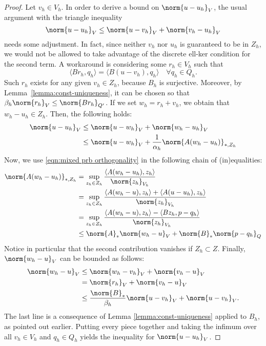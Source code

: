 \begin{proof}
	Let $v_h \in V_h$. In order to derive a bound on $\norm{u-u_h}_V$, the usual argument with the triangle inequality
	\[
	\norm{u-u_h}_V\leq\norm{u-v_h}_V+\norm{v_h-u_h}_V
	\]
	needs some adjustment. In fact, since neither $v_h$ nor $u_h$ is guaranteed to be in $Z_h$, we would not be allowed to take advantage of the discrete ell-ker condition for the second term. A workaround is considering some $r_h \in V_h$ such that
	\[
	\langle Br_h , q_h \rangle = \langle B (u-v_h) , q_h \rangle \quad \forall q_h \in Q_h.
	\]
	Such $r_h$ exists for any given $v_h\in Z_h$, because $B_h$ is surjective. Moreover, by Lemma~\ref{lemma:const-uniqueness}, it can be chosen so that $\beta_h \norm{r_h}_V \le \norm{Br_h}_{Q'}$. If we set $w_h = r_h + v_h$, we obtain that $w_h - u_h \in Z_h$. Then, the following holds:
	\begin{align*}
	    \norm{u-u_h}_V&\leq\norm{u-w_h}_V+\norm{w_h-u_h}_V\\
	    &\leq\norm{u-w_h}_V +\frac{1}{\alpha_h}\norm{A(w_h-u_h)}_{*,Z_h}
	\end{align*}
	Now, we use \eqref{eqn:mixed prb orthogonality} in the following chain of (in)equalities:
	\begin{align*}
	    \norm{A(w_h-u_h)}_{*,Z_h} &= \sup_{z_h\in Z_h}\frac{\langle A(w_h-u_h),z_h\rangle}{\norm{z_h}_{V_h}}\\
	    &= \sup_{z_h\in Z_h}\frac{\langle A(w_h-u),z_h\rangle + \langle A(u-u_h),z_h\rangle}{\norm{z_h}_{V_h}}\\
	    &= \sup_{z_h\in Z_h}\frac{\langle A(w_h-u),z_h\rangle - \langle Bz_h,p-q_h\rangle}{\norm{z_h}_{V_h}}\\
	    &\leq \norm{A}_*\norm{w_h-u}_V+\norm{B}_*\norm{p-q_h}_Q
	\end{align*}
	Notice in particular that the second contribution vanishes if $Z_h \subset Z$. Finally, $\norm{w_h-u}_V$ can be bounded as follows:
	\begin{align}
		\norm{w_h-u}_V &\le \norm{w_h-v_h}_V + \norm{v_h-u}_V \\
		&= \norm{r_h}_V + \norm{v_h-u}_V \\
		&\le \frac{\norm{B}_*}{\beta_h} \norm{u-v_h}_V + \norm{u-v_h}_V.
	\end{align}
	The last line is a consequence of Lemma \ref{lemma:const-uniqueness} applied to $B_h$, as pointed out earlier. Putting every piece together and taking the infimum over all $v_h \in V_h$ and $q_h \in Q_h$ yields the inequality for $\norm{u-u_h}_V$.
	

\end{proof}

